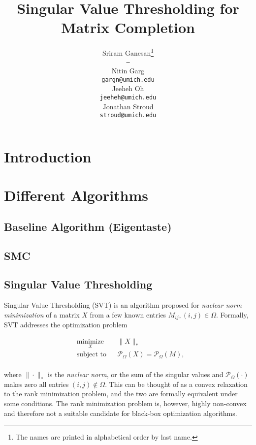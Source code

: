 \documentclass{article} %
\title{Singular Value Thresholding for Matrix Completion}
\author{
Sriram Ganesan\thanks{ The names are printed in alphabetical order by last name.} \\
\texttt{---} \\
\And
Nitin Garg \\
\texttt{gargn@umich.edu} \\
\AND
Jeeheh Oh \\
\texttt{jeeheh@umich.edu} \\
\And
Jonathan Stroud \\
\texttt{stroud@umich.edu} \\
}
\begin{document}
\maketitle

\begin{abstract}

\end{abstract}

\section{Introduction}

\section{Different Algorithms}

\subsection{Baseline Algorithm (Eigentaste)}

\subsection{SMC}


\subsection{Singular Value Thresholding}

Singular Value Thresholding (SVT) \cite{cai2010singular} is an
algorithm proposed for \emph{nuclear norm minimization} of a matrix
$X$ from a few known entries $M_{ij}, (i,j) \in \Omega$. Formally, SVT
addresses the optimization problem

\begin{equation*}
\begin{aligned}
  & \underset{X}{\text{minimize}} & & \|X\|_{*} \\
  & \text{subject to}             & & \mathcal{P}_\Omega (X) =
  \mathcal{P}_\Omega (M), \\
\end{aligned}
\end{equation*}

where $\|\cdot\|_{*}$ is the \emph{nuclear norm}, or the sum of the
singular values and $\mathcal{P}_\Omega (\cdot)$ makes zero all
entries $(i, j) \notin \Omega$. This can be thought of as a convex
relaxation to the rank minimization problem, and the two are formally
equivalent under some conditions. The rank minimization problem is,
however, highly non-convex and therefore not a suitable candidate for
black-box optimization algorithms.
\end{document}
